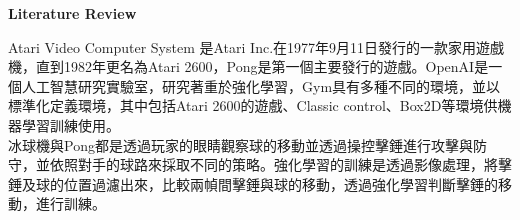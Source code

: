 \begin{flushleft}
{\large \textbf{Literature Review}}\\
\end{flushleft}
\qquad Atari Video Computer System 是Atari Inc.在1977年9月11日發行的一款家用遊戲機，直到1982年更名為Atari 2600，Pong是第一個主要發行的遊戲。OpenAI是一個人工智慧研究實驗室，研究著重於強化學習，Gym具有多種不同的環境，並以標準化定義環境，其中包括Atari 2600的遊戲、Classic control、Box2D等環境供機器學習訓練使用。\\

冰球機與Pong都是透過玩家的眼睛觀察球的移動並透過操控擊錘進行攻擊與防守，並依照對手的球路來採取不同的策略。強化學習的訓練是透過影像處理，將擊錘及球的位置過濾出來，比較兩幀間擊錘與球的移動，透過強化學習判斷擊錘的移動，進行訓練。\\

